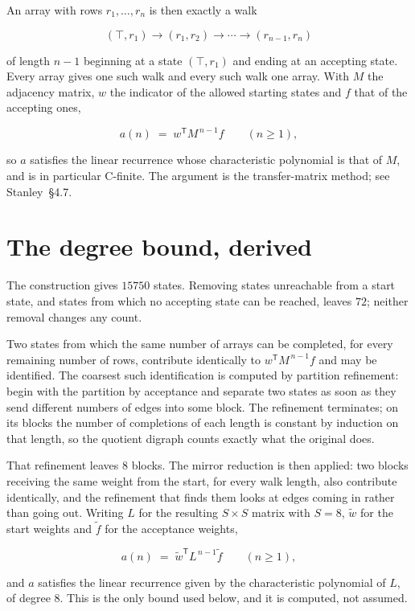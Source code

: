 \documentclass[11pt]{article}
\theoremstyle{definition}
\begin{document}
An array with rows $r_1,\dots,r_n$ is then exactly a walk

\[(\top,r_1) \to (r_1,r_2) \to \cdots \to (r_{n-1},r_n)\]

of length $n-1$ beginning at a state $(\top,r_1)$ and ending at an accepting state. Every array gives one such walk and every such walk one array. With $M$ the adjacency matrix, $w$ the indicator of the allowed starting states and $f$ that of the accepting ones,

\[a(n) \;=\; w^{\mathsf T} M^{\,n-1} f \qquad (n \ge 1),\]

so $a$ satisfies the linear recurrence whose characteristic polynomial is that of $M$, and is in particular C-finite. The argument is the transfer-matrix method; see Stanley~\S4.7.

\section{The degree bound, derived}

The construction gives $15750$ states. Removing states unreachable from a start state, and states from which no accepting state can be reached, leaves $72$; neither removal changes any count.

Two states from which the same number of arrays can be completed, for every remaining number of rows, contribute identically to $w^{\mathsf T}M^{\,n-1}f$ and may be identified. The coarsest such identification is computed by partition refinement: begin with the partition by acceptance and separate two states as soon as they send different numbers of edges into some block. The refinement terminates; on its blocks the number of completions of each length is constant by induction on that length, so the quotient digraph counts exactly what the original does.

That refinement leaves $8$ blocks. The mirror reduction is then applied: two blocks receiving the same weight from the start, for every walk length, also contribute identically, and the refinement that finds them looks at edges coming in rather than going out. Writing $L$ for the resulting $S \times S$ matrix with $S = 8$, $\tilde w$ for the start weights and $\tilde f$ for the acceptance weights,

\[a(n) \;=\; \tilde w^{\mathsf T} L^{\,n-1} \tilde f \qquad (n \ge 1),\]

and $a$ satisfies the linear recurrence given by the characteristic polynomial of $L$, of degree $8$. This is the only bound used below, and it is computed, not assumed.
\end{document}
